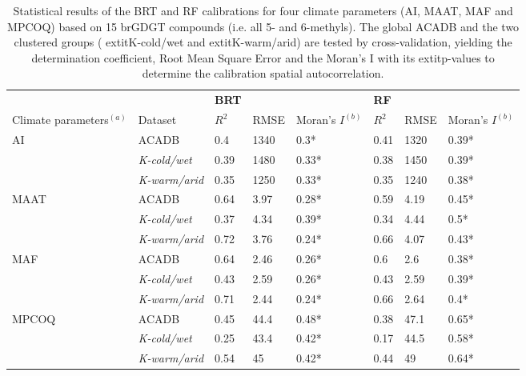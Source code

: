 \begin{table}[ht]
\centering
\caption{Statistical results of the BRT and RF calibrations for four climate parameters (AI, MAAT, MAF and MPCOQ) based on 15 brGDGT compounds (i.e. all 5- and 6-methyls). The global ACADB and the two clustered groups (	extit{K-cold/wet} and 	extit{K-warm/arid}) are tested by cross-validation, yielding the determination coefficient, Root Mean Square Error and the Moran's I with its 	extit{p}-values to determine the calibration spatial autocorrelation.} 
\label{FT_table}
\begin{tabular}{llllllll}
  \toprule
 &  & \textbf{BRT} &  &  & \textbf{RF} &  &  \\ 
 Climate parameters$^{(a)}$ & Dataset & $R^2$ & RMSE & Moran's $I^{(b)}$ & $R^2$ & RMSE & Moran's $I^{(b)}$ \\ 
   \midrule
AI & ACADB & 0.4 & 1340 & 0.3* & 0.41 & 1320 & 0.39* \\ 
   & \textit{K-cold/wet} & 0.39 & 1480 & 0.33* & 0.38 & 1450 & 0.39* \\ 
   & \textit{K-warm/arid} & 0.35 & 1250 & 0.33* & 0.35 & 1240 & 0.38* \\ 
   \midrule
MAAT & ACADB & 0.64 & 3.97 & 0.28* & 0.59 & 4.19 & 0.45* \\ 
   & \textit{K-cold/wet} & 0.37 & 4.34 & 0.39* & 0.34 & 4.44 & 0.5* \\ 
   & \textit{K-warm/arid} & 0.72 & 3.76 & 0.24* & 0.66 & 4.07 & 0.43* \\ 
   \midrule
MAF & ACADB & 0.64 & 2.46 & 0.26* & 0.6 & 2.6 & 0.38* \\ 
   & \textit{K-cold/wet} & 0.43 & 2.59 & 0.26* & 0.43 & 2.59 & 0.39* \\ 
   & \textit{K-warm/arid} & 0.71 & 2.44 & 0.24* & 0.66 & 2.64 & 0.4* \\ 
   \midrule
MPCOQ & ACADB & 0.45 & 44.4 & 0.48* & 0.38 & 47.1 & 0.65* \\ 
   & \textit{K-cold/wet} & 0.25 & 43.4 & 0.42* & 0.17 & 44.5 & 0.58* \\ 
   & \textit{K-warm/arid} & 0.54 & 45 & 0.42* & 0.44 & 49 & 0.64* \\ 
   \bottomrule
\end{tabular}
\end{table}

